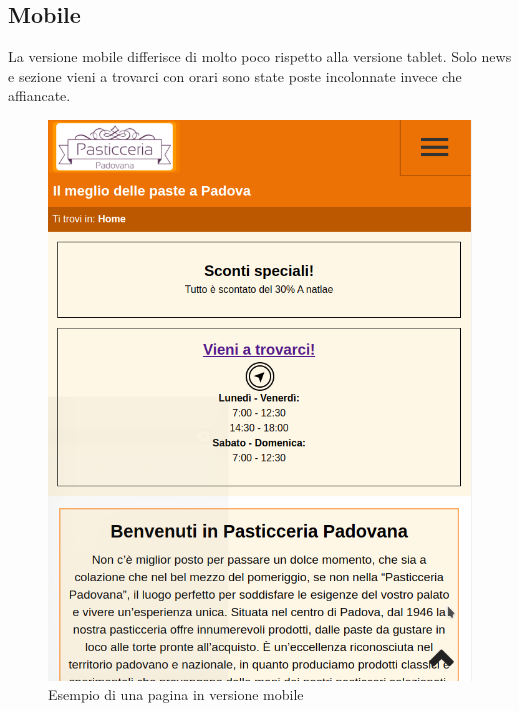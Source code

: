 \subsection{Mobile}
La versione mobile differisce di molto poco rispetto alla versione tablet. Solo news e sezione vieni a trovarci con orari sono state poste incolonnate invece che affiancate.
\begin{figure}[!h]
    \centering		  
	\includegraphics[width=0.8\linewidth]{sezioni/Progettazione/Immagini/mobile_example.png}
	\caption{Esempio di una pagina in versione mobile}
	\label{Fig:verMobile}
\end{figure}
\newpage

